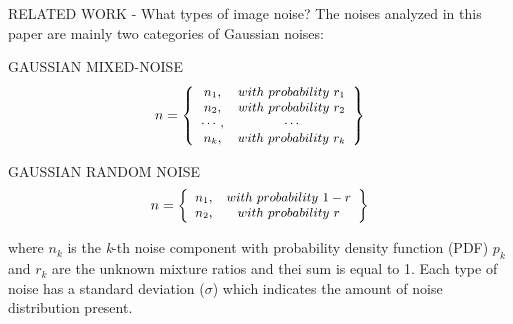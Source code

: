 \begin{frame}{RELATED WORK - What types of image noise?}
    The noises analyzed in this paper are mainly two categories of Gaussian 
    noises:
    \begin{minipage}{\linewidth}
        \centering
        \begin{minipage}{0.45\linewidth}
            \begin{block}{GAUSSIAN MIXED-NOISE}
                $$
                \small
                n = \left\{
                    \begin{array}{cc}
                        n_1, & with~probability~r_1\\
                        n_2, & with~probability~r_2\\
                        \cdots, & \cdots\\
                        n_k, & with~probability~r_k\\ 
                    \end{array}
                    \right\}
                $$
            \end{block}  
        \end{minipage}
        \hspace{0.05\linewidth}
        \begin{minipage}{0.47\linewidth}
            \begin{block}{GAUSSIAN RANDOM NOISE}
                $$
                \small
                n = \left\{
                    \begin{array}{cc}
                        n_1, & with~probability~1-r\\
                        n_2, & with~probability~r\\
                    \end{array}
                    \right\}
                $$
            \end{block} 
        \end{minipage}
    \end{minipage}
    where $ n_k $ is the \emph{k}-th noise component with probability density function (PDF) 
    $ p_k $ and $ r_k $ are the unknown mixture ratios and thei sum is equal to 
    1. Each type of noise has a standard deviation ($\sigma$) which indicates the 
    amount of noise distribution present.     
\end{frame}